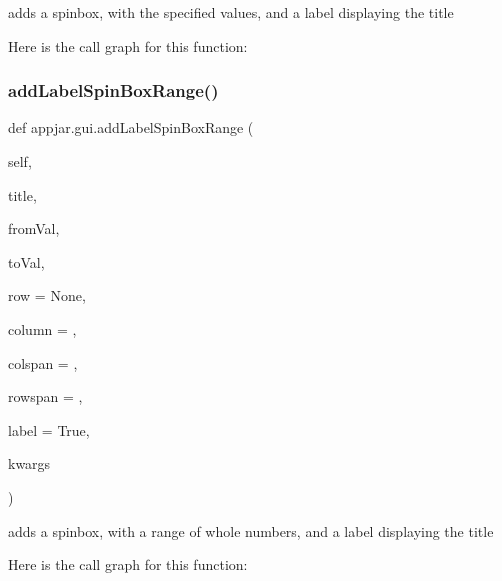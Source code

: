 \begin{DoxyVerb}adds a spinbox, with the specified values, and a label displaying the title \end{DoxyVerb}
 Here is the call graph for this function\+:
\mbox{\label{classappjar_1_1gui_af6f7f43041b9da75c011fdbbe5b604e7}} 
\subsubsection{\texorpdfstring{add\+Label\+Spin\+Box\+Range()}{addLabelSpinBoxRange()}}
{\footnotesize\ttfamily def appjar.\+gui.\+add\+Label\+Spin\+Box\+Range (\begin{DoxyParamCaption}\item[{}]{self,  }\item[{}]{title,  }\item[{}]{from\+Val,  }\item[{}]{to\+Val,  }\item[{}]{row = {\ttfamily None},  }\item[{}]{column = {},  }\item[{}]{colspan = {},  }\item[{}]{rowspan = {},  }\item[{}]{label = {\ttfamily True},  }\item[{}]{kwargs }\end{DoxyParamCaption})}

\begin{DoxyVerb}adds a spinbox, with a range of whole numbers, and a label displaying the title \end{DoxyVerb}
 Here is the call graph for this function\+:
\mbox{\label{classappjar_1_1gui_a6a0bbd621cd1535852a1d8957385a7bb}} 
